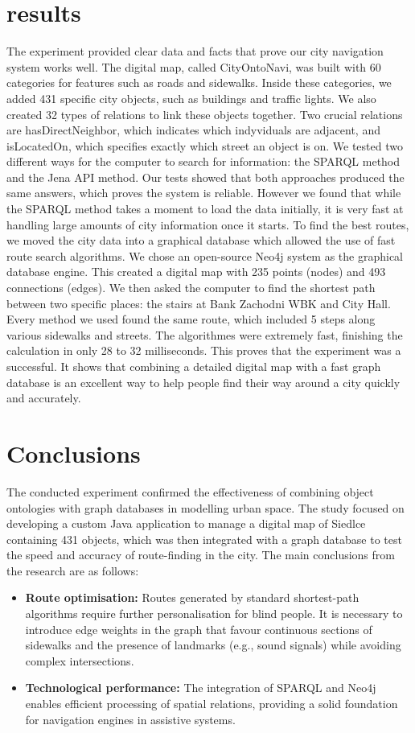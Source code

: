 \documentclass[conference]{IEEEtran}
\begin{document}
\section{results}
The experiment provided clear data and facts that prove our city navigation system works well. 
The digital map, called CityOntoNavi, was built with 60 categories for features such as roads and sidewalks. 
Inside these categories, we added 431 specific city objects, such as buildings and traffic lights. 
We also created 32 types of relations to link these objects together. 
Two crucial relations are hasDirectNeighbor, which indicates which indyviduals are adjacent, and isLocatedOn, which specifies exactly which street an object is on.
We tested two different ways for the computer to search for information: the SPARQL method and the Jena API method. 
Our tests showed that both approaches produced the same answers, which proves the system is reliable. 
However we found that while the SPARQL method takes a moment to load the data initially, it is very fast at handling large amounts of city information once it starts.
To find the best routes, we moved the city data into a graphical database which allowed the use of fast route search algorithms.
We chose an open-source Neo4j system as the graphical database engine.
This created a digital map with 235 points (nodes) and 493 connections (edges). 
We then asked the computer to find the shortest path between two specific places: the stairs at Bank Zachodni WBK and City Hall. 
Every method we used found the same route, which included 5 steps along various sidewalks and streets.
The algorithmes were extremely fast, finishing the calculation in only 28 to 32 milliseconds. 
This proves that the experiment was a successful.
It shows that combining a detailed digital map with a fast graph database is an excellent way to help people find their way around a city quickly and accurately.

\section{Conclusions}
The conducted experiment confirmed the effectiveness of combining object ontologies with graph databases in modelling urban space. 
The study focused on developing a custom Java application to manage a digital map of Siedlce containing 431 objects, which was then integrated with a graph database to test the speed and accuracy of route-finding in the city. 
The main conclusions from the research are as follows:
\begin{itemize}
\item {\bf Route optimisation:} Routes generated by standard shortest-path algorithms require further personalisation for blind people. 
It is necessary to introduce edge weights in the graph that favour continuous sections of sidewalks and the presence of landmarks (e.g., sound signals) while avoiding complex intersections.
\item {\bf Technological performance:} The integration of SPARQL and Neo4j enables efficient processing of spatial relations, providing a solid foundation for navigation engines in assistive systems.
\end{itemize}
\end{document}
